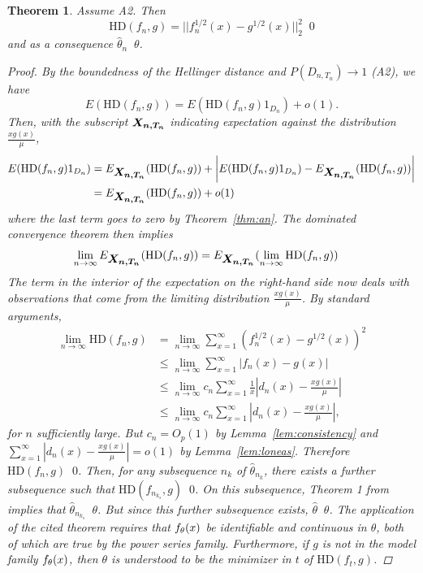 \documentclass[11 pt]{article}
\newtheorem{thm}{Theorem}
\renewcommand{\th}{\theta}
\newcommand{\xra}[1]{\mathop{ \xrightarrow{#1} }}
\newcommand{\boldXnt}{\mbox{\boldmath $X_{n,T_n}$}}
\newcommand{\Dnt}{D_{n,T_n}}
\newcommand{\hell}{\text{HD}}
\newcommand{\gs}{\frac{xg(x)}{\mu}}
\begin{document}
\begin{thm}
\label{thm:consistency}
Assume A2. Then 
\[
\hell(f_n,g) = ||f_n^{1/2}(x) - g^{1/2}(x)||_2^2 \xra{p} 0
\]
and as a consequence $\hat{\th}_n \xra{p} \th$.
\begin{proof}
By the boundedness of the Hellinger distance and $P(\Dnt) \rightarrow 1$ (A2), we have
\[
E(\hell(f_n,g)) = E(\hell(f_n,g)1_{D_n}) + o(1).
\]
Then, with the subscript $\boldXnt$ indicating expectation against the distribution $\gs$,
\begin{align*}
E(\hell(f_n,g)1_{D_n}) &= E_{\boldXnt}(\hell(f_n,g)) + \bigg|E(\hell(f_n,g)1_{D_n})  - E_{\boldXnt}(\hell(f_n,g)) \bigg| \\
&= E_{\boldXnt}(\hell(f_n,g)) + o(1)
\end{align*}
where the last term goes to zero by Theorem~\ref{thm:an}. The dominated convergence theorem then implies
\begin{align*}
\lim_{n \rightarrow \infty} E_{\boldXnt}(\hell(f_n,g)) &=  E_{\boldXnt}( \lim_{n \rightarrow \infty} \hell(f_n,g))
\end{align*}
The term in the interior of the expectation on the right-hand side now deals with observations that come from the limiting distribution $\gs$. By standard arguments,
\begin{align*}
\lim_{n \rightarrow \infty} \hell(f_n,g) &= \lim_{n \rightarrow \infty} \sum_{x=1}^{\infty} (f_n^{1/2}(x) - g^{1/2}(x))^2 \\
&\leq \lim_{n \rightarrow \infty} \sum_{x=1}^{\infty} |f_n(x) - g(x)| \\
&\leq \lim_{n \rightarrow \infty} c_n \sum_{x=1}^{\infty} \frac{1}{x}|d_n(x) - \gs| \\
&\leq \lim_{n \rightarrow \infty} c_n \sum_{x=1}^{\infty} |d_n(x) - \gs|,
\end{align*}
for $n$ sufficiently large. But $c_n = O_p(1)$ by Lemma~\ref{lem:consistency} and $\sum_{x=1}^{\infty} |d_n(x) - \gs| = o(1)$ by Lemma~\ref{lem:loneas}. Therefore $\hell(f_n,g) \xra{p} 0$. Then, for any subsequence $n_k$ of $\hat{\th}_{n_k}$, there exists a further subsequence such that $\hell(f_{n_{k_s}},g) \xra{a.s.} 0$. On this subsequence, Theorem 1 from \cite{beran1977minimum} implies that $\hat{\th}_{n_{k_s}} \xra{a.s.} \th$. But since this further subsequence exists, $\hat{\th} \xra{p} \th$. The application of the cited theorem requires that $\fth$ be identifiable and continuous in $\th$, both of which are true by the power series family. Furthermore, if $g$ is not in the model family $\fth$, then $\th$ is understood to be the minimizer in $t$ of $\hell(f_t,g)$.


\end{proof}
\end{thm}
\end{document}
